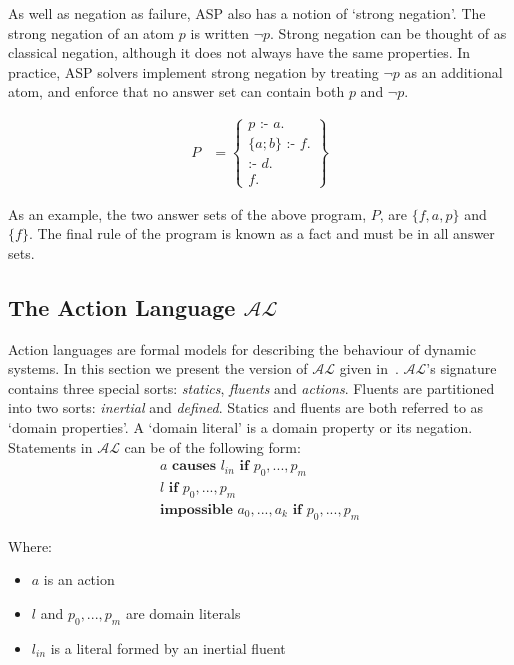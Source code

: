 \documentclass[../interim.tex]{subfiles}
\begin{document}

As well as negation as failure, ASP also has a notion of `strong negation'. The strong negation of an atom $p$ is written $\neg p$. Strong negation can be thought of as classical negation, although it does not always have the same properties. In practice, ASP solvers implement strong negation by treating $\neg p$ as an additional atom, and enforce that no answer set can contain both $p$ and $\neg p$.

\begin{align}
  P &=
  \left\{
  \begin{array}{l}
    p \text{ :- } a. \\
    \{a;b\} \text{ :- } f. \\
    \text{:- } d. \\
    f.
  \end{array}
  \right\}
\end{align}

As an example, the two answer sets of the above program, $P$, are $\{ f, a, p \}$ and $\{ f \}$. The final rule of the program is known as a fact and must be in all answer sets.

\subsection{The Action Language $\mathcal{AL}$}

Action languages are formal models for describing the behaviour of dynamic systems. In this section we present the version of $\mathcal{AL}$ given in~\cite{krr-asp-book}. $\mathcal{AL}$'s signature contains three special sorts: \textit{statics}, \textit{fluents} and \textit{actions}. Fluents are partitioned into two sorts: \textit{inertial} and \textit{defined}. Statics and fluents are both referred to as `domain properties'. A `domain literal' is a domain property or its negation. Statements in $\mathcal{AL}$ can be of the following form:
\begin{gather}
  a \textbf{ causes } l_{in} \textbf{ if } p_0,...,p_m \label{al:causal} \\
  l \textbf{ if } p_0,...,p_m \label{al:constraint} \\
  \textbf{impossible } a_0,...,a_k \textbf{ if } p_0,...,p_m \label{al:exec}
\end{gather}
\noindent
{\footnotesize Where:
\vspace{-0.8em}
\renewcommand{\labelitemi}{$\textendash$}
\begin{itemize}
  \setlength\itemsep{-0.4em}
  \item $a$ is an action
  \item $l$ and $p_0,...,p_m$ are domain literals
  \item $l_{in}$ is a literal formed by an inertial fluent
\end{itemize}}
\end{document}
